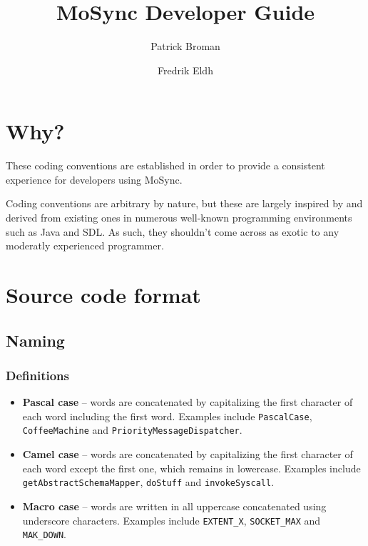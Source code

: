\documentclass {article}
\title{MoSync Developer Guide}
\author{Patrick Broman \and Fredrik Eldh}
\begin{document}
\maketitle


\setcounter{page}{1}
\pagestyle{fancy}

\section{Why?}

These coding conventions are established in order to provide a consistent
experience for developers using MoSync.

Coding conventions are arbitrary by nature, but these are largely inspired by
and derived from existing ones in numerous well-known programming environments
such as Java and SDL. As such, they shouldn't come across as exotic to any moderatly
experienced programmer.


\section{Source code format}

\subsection{Naming}

\subsubsection{Definitions}

\begin{itemize}

\item \textbf{Pascal case} -- words are concatenated by capitalizing the first 
character of each word including the first word. Examples include 
\verb|PascalCase|, \verb|CoffeeMachine| and \verb|PriorityMessageDispatcher|.

\item \textbf{Camel case} -- words are concatenated by capitalizing the first character 
of each word except the first one, which remains in lowercase. 
Examples include \verb|getAbstractSchemaMapper|, \verb|doStuff| and \verb|invokeSyscall|.

\item \textbf{Macro case} -- words are written in all uppercase 
concatenated using underscore characters. 
Examples include \verb|EXTENT_X|, \verb|SOCKET_MAX| and \verb|MAK_DOWN|.

\end{itemize}
\end{document}
